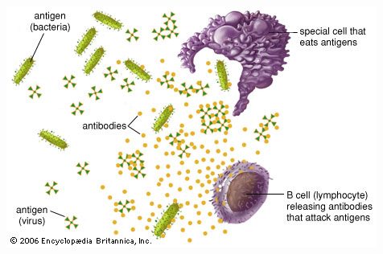\documentclass{beamer}
\begin{document}
\begin{frame}
\begin{columns}
\begin{column}{5cm}
    \end{column}
  \end{columns}

\end{frame}

\begin{frame}
\includegraphics[width=\textwidth]{antigens-antibodies.jpg}
\end{frame}
\end{document}
